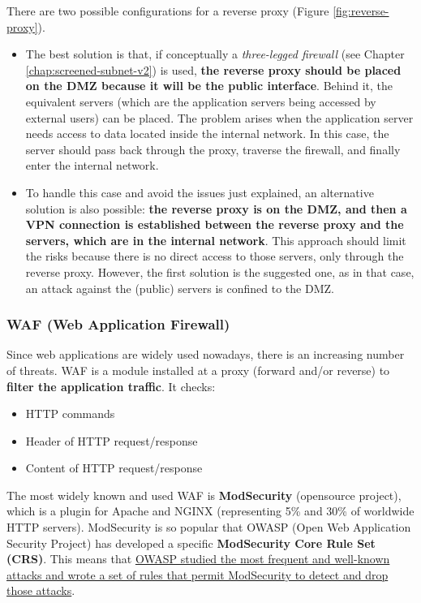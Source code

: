 There are two possible configurations for a reverse proxy (Figure \ref{fig:reverse-proxy}).
\begin{itemize}
	\item [left.] The best solution is that, if conceptually a \textit{three-legged firewall} (see Chapter \ref{chap:screened-subnet-v2}) is used, \textbf{the reverse proxy should be placed on the DMZ because it will be the public interface}. Behind it, the equivalent servers (which are the application servers being accessed by external users) can be placed. The problem arises when the application server needs access to data located inside the internal network. In this case, the server should pass back through the proxy, traverse the firewall, and finally enter the internal network.
	\item [right.] To handle this case and avoid the issues just explained, an alternative solution is also possible: \textbf{the reverse proxy is on the DMZ, and then a VPN connection is established between the reverse proxy and the servers, which are in the internal network}. This approach should limit the risks because there is no direct access to those servers, only through the reverse proxy. However, the first solution is the suggested one, as in that case, an attack against the (public) servers is confined to the DMZ.
\end{itemize}


\subsubsection{WAF (Web Application Firewall)}

Since web applications are widely used nowadays, there is an increasing number of threats. WAF is a module installed at a proxy (forward and/or reverse) to \textbf{filter the application traffic}. It checks:

\begin{itemize}
	\item HTTP commands
	\item Header of HTTP request/response
	\item Content of HTTP request/response
\end{itemize}

The most widely known and used WAF is \textbf{ModSecurity} (opensource project), which is a plugin for Apache and NGINX (representing 5\% and 30\% of worldwide HTTP servers). ModSecurity is so popular that OWASP (Open Web Application Security Project) has developed a specific \textbf{ModSecurity Core Rule Set} \textbf{(CRS)}. This means that \ul{OWASP studied the most frequent and well-known attacks and wrote a set of rules that permit ModSecurity to detect and drop those attacks}.


